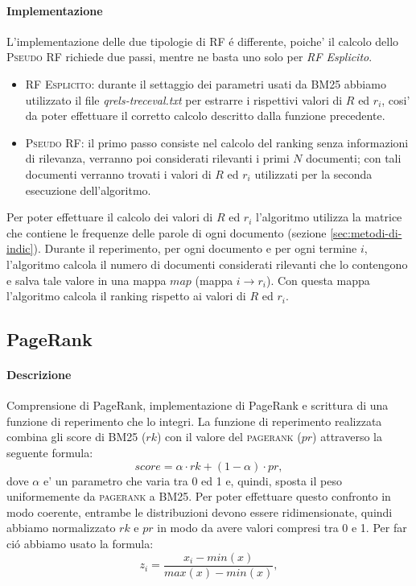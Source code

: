 \paragraph{\textbf{Implementazione}} 
L'implementazione delle due tipologie di \textsc{RF} \'e differente, poiche' il calcolo dello \textsc{Pseudo RF} richiede due passi, mentre ne basta uno solo per \textit{RF Esplicito}.
\begin{itemize}
\item \textsc{RF Esplicito}: durante il settaggio dei parametri usati da \textsc{BM25} abbiamo utilizzato il file \textit{qrels-treceval.txt} per estrarre i rispettivi valori di $R$ ed $r_i$, cosi' da poter effettuare il corretto calcolo descritto dalla funzione precedente.
\item \textsc{Pseudo RF}: il primo passo consiste nel calcolo del ranking senza informazioni di rilevanza, verranno poi considerati rilevanti i primi $N$ documenti; con tali documenti verranno trovati i valori di $R$ ed $r_i$ utilizzati per la seconda esecuzione dell'algoritmo.
\end{itemize}
Per poter effettuare il calcolo dei valori di $R$ ed $r_i$ l'algoritmo utilizza la matrice che contiene le frequenze delle parole di ogni documento (sezione \ref{sec:metodi-di-indic}). Durante il reperimento, per ogni documento e per ogni termine $i$, l'algoritmo calcola il numero di documenti considerati rilevanti che lo contengono e salva tale valore in una mappa $map$ (mappa $i \rightarrow r_i$). Con questa mappa l'algoritmo calcola il ranking rispetto ai valori di $R$ ed $r_i$.

\subsection{PageRank}
\label{sec:pagerank}

\paragraph{\textbf{Descrizione}}
Comprensione di PageRank, implementazione di PageRank e scrittura di una funzione di reperimento che lo integri.
La funzione di reperimento realizzata combina gli score di \textsc{BM25} ($rk$) con il valore del \textsc{pagerank} ($pr$) attraverso la seguente formula:
\[ score =  \alpha \cdot rk + (1-\alpha) \cdot pr,\]
dove $\alpha$ e' un parametro che varia tra 0 ed 1 e, quindi, sposta il peso uniformemente da \textsc{pagerank} a \textsc{BM25}.
Per poter effettuare questo confronto in modo coerente, entrambe le distribuzioni devono essere ridimensionate, quindi abbiamo normalizzato $rk$ e $pr$ in modo da avere valori compresi tra 0 e 1. Per far ci\'o abbiamo usato la formula:
\[ z_i = \frac{x_i - min(x)}{max(x) - min(x)}, \]


